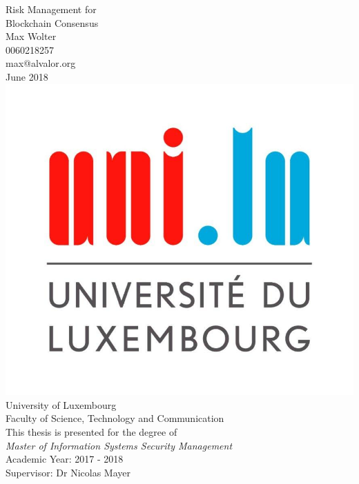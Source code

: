 \documentclass[12pt,a4paper]{article}
\begin{document}
\thispagestyle{empty}

\begin{center}
  {\huge Risk Management for\\Blockchain Consensus}\\
  \vspace{1cm}
  {\large Max Wolter\\0060218257\\max@alvalor.org}\\
  \vspace{1cm}
  {\Large June 2018}\\
  \vspace{2cm}
  \includegraphics[scale=0.25]{logo_uni.jpg}\\
  \vspace{1.5cm}
  {\Large University of Luxembourg\\
  Faculty of Science, Technology and Communication}\\
  \vspace{1cm}
  {\large This thesis is presented for the degree of\\
  \textit{Master of Information Systems Security Management}}\\
  \vspace{1cm}
  {\large Academic Year: 2017 - 2018\\Supervisor: Dr Nicolas Mayer}\\
\end{center}
\end{document}
